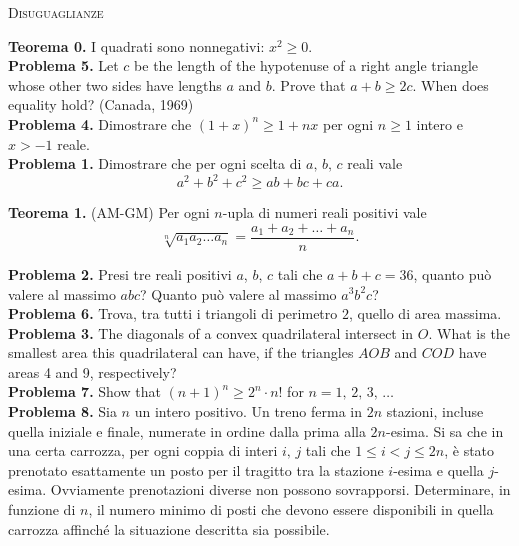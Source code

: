 \documentclass[a4paper]{article}
\theoremstyle{remark}
\theoremstyle{definition}
\begin{document}
\begin{center}
	\textsc{Disuguaglianze}
\end{center}

\begin{multicols}{2}
	\textbf{Teorema 0.} I quadrati sono nonnegativi: $ x^2 \geq 0. $ \\
	
	\textbf{Problema 5.} Let $ c $ be the length of the hypotenuse of a right angle triangle whose other two sides have
	lengths $ a $ and $ b $. Prove that $ a + b \geq 2c $. When does equality hold? (Canada, 1969)\\
	
	\textbf{Problema 4.} Dimostrare che $ (1+x)^n \geq 1+nx $ per ogni $ n \geq 1 $ intero e $ x > -1 $ reale.\\
	
	\textbf{Problema 1.} Dimostrare che per ogni scelta di $ a, \, b , \, c $ reali vale
	\[ a^2 + b^2 + c^2 \geq ab + bc + ca. \]
	
	\textbf{Teorema 1.} (AM-GM) Per ogni $ n $-upla di numeri reali positivi vale
		\[ \sqrt[n]{a_1a_2\dots a_n} = \frac{a_1 + a_2 + \dots + a_n}{n}. \]
	
	\textbf{Problema 2.} Presi tre reali positivi $a$, $b$, $c$ tali che $a+b+c = 36$, quanto può valere al massimo $abc$? Quanto può valere al massimo $a^3b^2c$? \\
	
	\textbf{Problema 6.} Trova, tra tutti i triangoli di perimetro $2$, quello di area massima.\\
	
	\textbf{Problema 3.} The diagonals of a convex quadrilateral intersect in $ O $. What is the smallest area
	this quadrilateral can have, if the triangles $ AOB $ and $ COD $ have areas 4 and 9,
	respectively?\\
	
	\textbf{Problema 7.} Show that $ (n + 1)^n \geq 2^n \cdot n! $ for $ n = 1,\, 2,\, 3,\, \dots $ \\
	
	\textbf{Problema 8.} Sia $ n $ un intero positivo. Un treno ferma in $ 2n $ stazioni, incluse quella iniziale e finale, numerate in
	ordine dalla prima alla $ 2n $-esima. Si sa che in una certa carrozza, per ogni coppia di interi $ i,\, j $ tali
	che $ 1 \leq i < j \leq 2n $, è stato prenotato esattamente un posto per il tragitto tra la stazione $ i $-esima
	e quella $ j $-esima. Ovviamente prenotazioni diverse non possono sovrapporsi. Determinare, in
	funzione di $ n $, il numero minimo di posti che devono essere disponibili in quella carrozza affinché
	la situazione descritta sia possibile.
	
	
	
\end{multicols}
\end{document}
